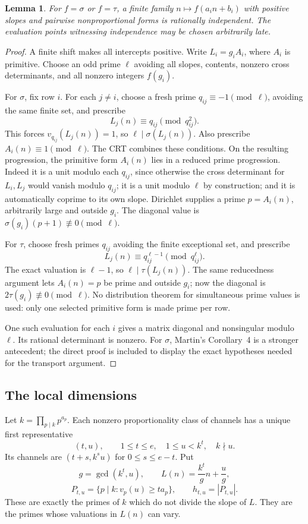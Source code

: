 \documentclass[11pt,a4paper]{article}
\newtheorem{lemma}[theorem]{Lemma}
\theoremstyle{definition}\newtheorem{definition}[theorem]{Definition}
\theoremstyle{remark}\newtheorem*{remark}{Remark}
\begin{document}
\begin{lemma}\label{lem:divisor-affine}
For $f=\sigma$ or $f=\tau$, a finite family $n\mapsto f(a_i n+b_i)$ with
positive slopes and pairwise nonproportional forms is rationally independent.
The evaluation points witnessing independence may be chosen arbitrarily late.
\end{lemma}
\begin{proof}
A finite shift makes all intercepts positive. Write $L_i=g_iA_i$, where $A_i$
is primitive. Choose an odd prime $\ell$ avoiding all slopes, contents,
nonzero cross determinants, and all nonzero integers $f(g_i)$.

For $\sigma$, fix row $i$. For each $j\ne i$, choose a fresh prime
$q_{ij}\equiv-1\pmod\ell$, avoiding the same finite set, and prescribe
\[
 L_j(n)\equiv q_{ij}\pmod{q_{ij}^2}.
\]
This forces $v_{q_{ij}}(L_j(n))=1$, so $\ell\mid\sigma(L_j(n))$.
Also prescribe $A_i(n)\equiv1\pmod\ell$. The CRT combines these conditions.
On the resulting progression, the primitive form $A_i(n)$ lies in a reduced
prime progression. Indeed it is a unit modulo each $q_{ij}$, since otherwise
the cross determinant for $L_i,L_j$ would vanish modulo $q_{ij}$; it is a unit
modulo $\ell$ by construction; and it is automatically coprime to its own
slope. Dirichlet supplies a prime $p=A_i(n)$, arbitrarily large and outside
$g_i$. The diagonal value is $\sigma(g_i)(p+1)\not\equiv0\pmod\ell$.

For $\tau$, choose fresh primes $q_{ij}$ avoiding the finite exceptional set,
and prescribe
\[
 L_j(n)\equiv q_{ij}^{\ell-1}\pmod{q_{ij}^{\ell}}.
\]
The exact valuation is $\ell-1$, so $\ell\mid\tau(L_j(n))$. The same
reducedness argument lets $A_i(n)=p$ be prime and outside $g_i$; now the
diagonal is $2\tau(g_i)\not\equiv0\pmod\ell$. No distribution theorem for
simultaneous prime values is used: only one selected primitive form is made
prime per row.

One such evaluation for each $i$ gives a matrix diagonal and nonsingular
modulo $\ell$. Its rational determinant is nonzero. For $\sigma$, Martin's
Corollary~4 is a stronger antecedent; the direct proof is included to display
the exact hypotheses needed for the transport argument.
\end{proof}

\subsection{The local dimensions}

Let $k=\prod_{p\mid k}p^{a_p}$. Each nonzero proportionality class of channels
has a unique first representative
\[
 (t,u),\qquad 1\le t\le e,\quad 1\le u<k^t,\quad k\nmid u.
\]
Its channels are $(t+s,k^su)$ for $0\le s\le e-t$. Put
\[
 g=\gcd(k^t,u),\qquad L(n)=\frac{k^t}{g}n+\frac ug,
\]
\begin{equation}\label{eq:Ptu}
 P_{t,u}=\{p\mid k:v_p(u)\ge t a_p\},\qquad h_{t,u}=|P_{t,u}|.
\end{equation}
These are exactly the primes of $k$ which do not divide the slope of $L$.
They are the primes whose valuations in $L(n)$ can vary.
\end{document}
